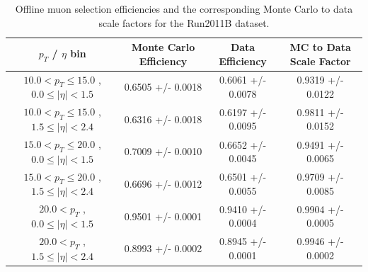  \begin{table}[!ht]
 \begin{center} 
 \begin{tabular}{|c|c|c|c|}
 \hline
 $p_{T}$ / $\eta$ bin    &  Monte Carlo Efficiency    &  Data Efficiency   &  MC to Data Scale Factor \\   \hline           
$ 10.0 < p_{T} \le  15.0$ , $  0.0  \le |\eta| <   1.5$   &       0.6505 +/- 0.0018   &       0.6061 +/- 0.0078   &       0.9319 +/- 0.0122   \\   
\hline
$ 10.0 < p_{T} \le  15.0$ , $  1.5  \le |\eta| <   2.4$   &       0.6316 +/- 0.0018   &       0.6197 +/- 0.0095   &       0.9811 +/- 0.0152   \\   
\hline
$ 15.0 < p_{T} \le  20.0$ , $  0.0  \le |\eta| <   1.5$   &       0.7009 +/- 0.0010   &       0.6652 +/- 0.0045   &       0.9491 +/- 0.0065   \\   
\hline
$ 15.0 < p_{T} \le  20.0$ , $  1.5  \le |\eta| <   2.4$   &       0.6696 +/- 0.0012   &       0.6501 +/- 0.0055   &       0.9709 +/- 0.0085   \\   
\hline
$ 20.0 < p_{T} $ , $  0.0  \le |\eta| <   1.5$   &       0.9501 +/- 0.0001   &       0.9410 +/- 0.0004   &       0.9904 +/- 0.0005   \\   
\hline
$ 20.0 < p_{T} $ , $  1.5  \le |\eta| <   2.4$   &       0.8993 +/- 0.0002   &       0.8945 +/- 0.0001   &       0.9946 +/- 0.0002   \\   
\hline
\end{tabular}
\caption{Offline muon selection efficiencies and the corresponding Monte Carlo to data scale factors for the
Run2011B dataset.}
\label{tab:eff_mu_offline_Run2011B}
\end{center}
\end{table}


